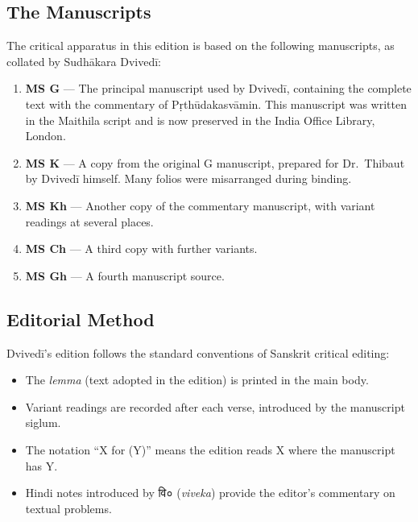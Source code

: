 \documentclass[11pt,a4paper]{article}
\newcommand{\dev}[1]{{\devanagarifont #1}}
\begin{document}
\subsection*{The Manuscripts}

The critical apparatus in this edition is based on the following manuscripts,
as collated by Sudhākara Dvivedī:

\begin{enumerate}[label=\textbf{\arabic*.}]
  \item \textbf{MS G} --- The principal manuscript used by Dvivedī, containing the
  complete text with the commentary of Pṛthūdakasvāmin. This manuscript was
  written in the Maithila script and is now preserved in the India Office
  Library, London.

  \item \textbf{MS K} --- A copy from the original G manuscript, prepared for
  Dr.\ Thibaut by Dvivedī himself. Many folios were misarranged during binding.

  \item \textbf{MS Kh} --- Another copy of the commentary manuscript, with variant
  readings at several places.

  \item \textbf{MS Ch} --- A third copy with further variants.

  \item \textbf{MS Gh} --- A fourth manuscript source.
\end{enumerate}

\subsection*{Editorial Method}

Dvivedī's edition follows the standard conventions of Sanskrit critical editing:

\begin{itemize}[label=\textbullet]
  \item The \textit{lemma} (text adopted in the edition) is printed in the main body.
  \item Variant readings are recorded after each verse, introduced by the
  manuscript siglum.
  \item The notation ``X \dev{for} (Y)'' means the edition reads X where the
  manuscript has Y.
  \item Hindi notes introduced by \dev{वि०} (\textit{viveka}) provide the editor's
  commentary on textual problems.
\end{itemize}
\end{document}
